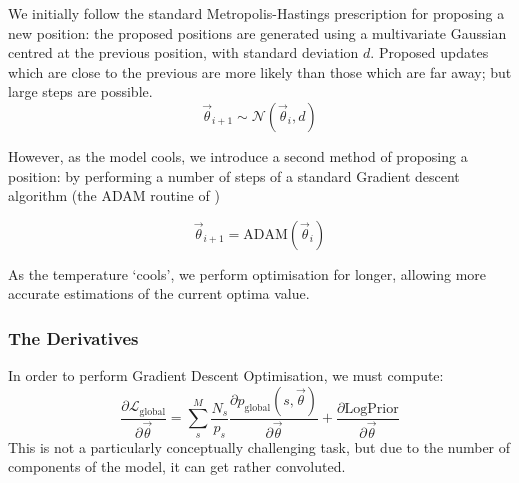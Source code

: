 \documentclass[fleqn,usenatbib]{mnras}
\newcommand{\pdiv}[2]{\frac{\partial #1}{\partial #2}}
\begin{document}
{					We initially follow the standard Metropolis-Hastings prescription for proposing a new position: the proposed positions are generated using a multivariate Gaussian centred at the previous position, with standard deviation $d$. Proposed updates which are close to the previous are more likely than those which are far away; but large steps are possible.
					\begin{equation}
						\vec{\theta}_{i+1} \sim \mathcal{N}\left( \vec{\theta}_i, d\right)
					\end{equation}

					However, as the model cools, we introduce a second method of proposing a position: by performing a number of steps of a standard Gradient descent algorithm (the ADAM routine of \citep{ADAM2017})

					\begin{equation}
						\vec{\theta}_{i+1} = \text{ADAM}(\vec{\theta}_i)
					\end{equation}

					As the temperature `cools', we perform optimisation for longer, allowing more accurate estimations of the current optima value. 
				\subsubsection{The Derivatives}

					In order to perform Gradient Descent Optimisation, we must compute:
					\begin{equation}
						\pdiv{\mathcal{L}_\text{global}}{\vec{\theta}} = \sum_s^M \frac{N_s}{{p}_s}  \pdiv{p_\text{global}(s,\vec{\theta})}{\vec{\theta}} + \pdiv{\text{LogPrior}}{\vec{\theta}}\label{E:MainDerivative}
					\end{equation}
					This is not a particularly conceptually challenging task, but due to the number of components of the model, it can get rather convoluted.
				
}
\end{document}
